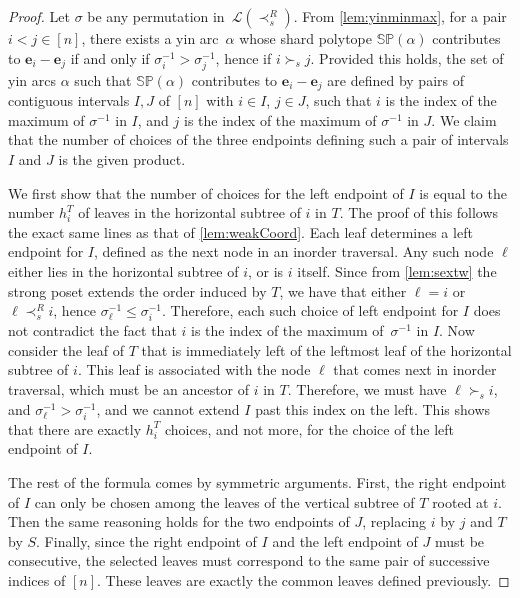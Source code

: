 \documentclass{amsart}
\theoremstyle{definition}
\renewcommand{\b}[1]{{\boldsymbol{#1}}} %
\newcommand{\polytope}[1]{\mathds{#1}} %
\newcommand{\SP}{\polytope{SP}}
\begin{document}
\begin{proof}
  Let $\sigma$ be any permutation in~$\mathcal{L}(\prec_s^R)$.
  From \cref{lem:yinminmax}, for a pair $i<j \in [n]$, there exists a yin arc~$\alpha$ whose shard polytope $\SP(\alpha)$ contributes to $\b{e}_i-\b{e}_j$ if and only if $\sigma^{-1}_i > \sigma^{-1}_j$, hence if $i\succ_s j$.
  Provided this holds, the set of yin arcs $\alpha$ such that $\SP(\alpha)$ contributes to $\b{e}_i-\b{e}_j$ are defined by pairs of contiguous intervals $I,J$ of $[n]$ with $i\in I$, $j\in J$, such that $i$ is the index of the maximum of $\sigma^{-1}$ in $I$, and $j$ is the index of the maximum of $\sigma^{-1}$ in $J$.
  We claim that the number of choices of the three endpoints defining such a pair of intervals $I$ and $J$ is the given product.

  We first show that the number of choices for the left endpoint of $I$ is equal to the number $h^T_i$ of leaves in the horizontal subtree of $i$ in $T$.
  The proof of this follows the exact same lines as that of \cref{lem:weakCoord}.
  Each leaf determines a left endpoint for $I$, defined as the next node in an inorder traversal.
  Any such node $\ell$ either lies in the horizontal subtree of $i$, or is $i$ itself.
  Since from \cref{lem:sextw} the strong poset extends the order induced by $T$, we have that either $\ell=i$ or $\ell\prec_s^R i$, hence $\sigma^{-1}_\ell \leq \sigma^{-1}_i$.
  Therefore, each such choice of left endpoint for $I$ does not contradict the fact that $i$ is the index of the maximum of~$\sigma^{-1}$ in $I$.
  Now consider the leaf of $T$ that is immediately left of the leftmost leaf of the horizontal subtree of $i$.
  This leaf is associated with the node $\ell$ that comes next in inorder traversal, which must be an ancestor of $i$ in $T$.
  Therefore, we must have $\ell\succ_s i$, and $\sigma^{-1}_\ell > \sigma^{-1}_i$, and we cannot extend $I$ past this index on the left.
  This shows that there are exactly $h^T_i$ choices, and not more, for the choice of the left endpoint of $I$.

  The rest of the formula comes by symmetric arguments.
  First, the right endpoint of $I$ can only be chosen among the leaves of the vertical subtree of $T$ rooted at $i$.
  Then the same reasoning holds for the two endpoints of $J$, replacing $i$ by $j$ and $T$ by $S$.
  Finally, since the right endpoint of $I$ and the left endpoint of $J$ must be consecutive, the selected leaves must correspond to the same pair of successive indices of $[n]$.
  These leaves are exactly the common leaves defined previously.
\end{proof}
\end{document}
